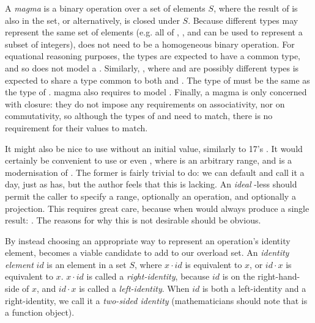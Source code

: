 \begin{itemdescr}
\pnum
A \textit{magma} is a binary operation  over a set of elements $S$, where the result of
 is also in the set, or alternatively,  is closed under
$S$\cite{wikipedia_magma}. Because different types may represent the same set of elements (e.g. all
of , , and  can be used to represent a subset of
integers),  does not need to be a homogeneous binary operation. For equational reasoning
purposes, the types are expected to have a common type, and so  does not
model a . Similarly, , where  and  are possibly
different types is expected to share a type common to both  and . The type of
 must be the same as the type of . magma also requires 
to model . Finally, a magma is only concerned with closure: they do not
impose any requirements on associativity, nor on commutativity, so although the types of
 and  need to match, there is no requirement for their values to
match.
\end{itemdescr}

It might also be nice to use  without an initial value, similarly to \Cpp{}17's
. It would certainly be convenient to use  or even
, where  is an arbitrary range, and
 is a modernisation of . The former is fairly trivial
to do: we can default  and call it a day, just as  has, but
the author feels that this is lacking. An \textit{ideal} -less  should
permit the caller to specify a range, optionally an operation, and optionally a projection. This
requires great care, because  when  would always
produce a single result: . The reasons for why this is not desirable should be obvious.

By instead choosing an appropriate way to represent an operation's identity element,
 becomes a viable candidate to add to our overload set. An
\textit{identity element} $id$ is an element in a set $S$, where $x \cdot id$ is equivalent to $x$,
or $id \cdot x$ is equivalent to $x$. $x \cdot id$ is called a \textit{right-identity}, because $id$
is on the right-hand-side of $x$, and $id \cdot x$ is called a \textit{left-identity}. When $id$ is
both a left-identity and a right-identity, we call it a \textit{two-sided identity} (mathematicians
should note that  is a function object).

